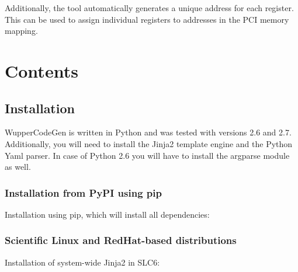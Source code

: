 \documentclass[letterpaper,10pt,english]{sphinxmanual}
\begin{document}
Additionally, the tool automatically generates a unique address for each
register. This can be used to assign individual registers to addresses
in the PCI memory mapping.



\chapter{Contents}
\label{\detokenize{index:the-wupper-code-generator}}\label{\detokenize{index:contents}}

\section{Installation}
\label{\detokenize{installation:installation}}\label{\detokenize{installation::doc}}
WupperCodeGen is written in Python and was tested with versions 2.6 and 2.7.
Additionally, you will need to install the Jinja2 template engine and the
Python Yaml parser. In case of Python 2.6 you will have to install the
argparse module as well.


\subsection{Installation from PyPI using pip}
\label{\detokenize{installation:installation-from-pypi-using-pip}}
Installation using pip, which will install all dependencies:

\begin{sphinxVerbatim}[commandchars=\\\{\}]
  
\end{sphinxVerbatim}


\subsection{Scientific Linux and RedHat-based distributions}
\label{\detokenize{installation:scientific-linux-and-redhat-based-distributions}}
Installation of system-wide Jinja2 in SLC6:

\begin{sphinxVerbatim}[commandchars=\\\{\}]
      
\end{sphinxVerbatim}
\end{document}
